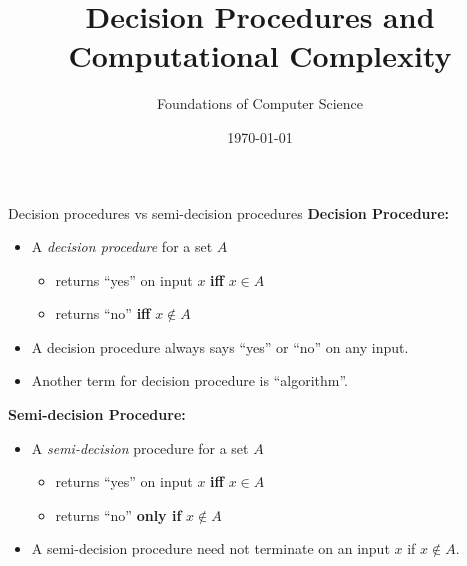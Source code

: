 \documentclass[style=sailor,size=12pt]{powerdot}
\title{Decision Procedures and \\ Computational Complexity}
\author{Foundations of Computer Science}
\date{\today}
\begin{document}
\maketitle
\begin{wideslide}[bm=,toc=]{Decision procedures vs semi-decision procedures}
\textbf{Decision Procedure:}
\begin{itemize}
\item<2-> A {\em decision procedure\/} for a set $A$ 
\begin{itemize}
\item<3-> returns ``yes'' on input $x$ {\bf iff} $x\in A$
\item<4-> returns ``no'' {\bf iff} $x\not\in A$
\end{itemize}
\item<5-> A decision procedure always says ``yes'' or ``no'' on any input.
\item<6-> Another term for decision procedure is ``algorithm''.
\end{itemize}
\pause[6]
\textbf{Semi-decision Procedure:}
\begin{itemize}
\item<8-> A {\em semi-decision\/} procedure for a set $A$ 
\begin{itemize}
\item<9-> returns ``yes'' on input $x$ {\bf iff} $x\in A$
\item<10-> returns ``no'' {\bf only if} $x\not\in A$
\end{itemize}
\item<11-> A semi-decision procedure need not terminate on an input $x$ if $x\not\in A$.
\end{itemize}
\end{wideslide}

\end{document}
